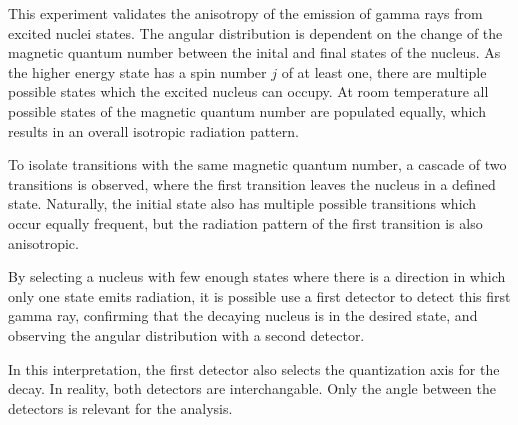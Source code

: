 
This experiment validates  the anisotropy of the emission of gamma rays from excited nuclei states.
The angular distribution is dependent on the change of the magnetic quantum number between the inital and final states of the nucleus.
As the higher energy state has a spin number $j$ of at least one, there are multiple possible states which the excited nucleus can occupy.
At room temperature all possible states of the magnetic quantum number are populated equally, which results in an overall isotropic radiation pattern.

To isolate transitions with the same magnetic quantum number, a cascade of two transitions is observed, where the first transition leaves the nucleus in a defined state.
Naturally, the initial state also has multiple possible transitions which occur equally frequent, but the radiation pattern of the first transition is also anisotropic.

By selecting a nucleus with few enough states where there is a direction in which only one state emits radiation, it is possible use a first detector to detect this first gamma ray, confirming that the decaying nucleus is in the desired state, and observing the angular distribution with a second detector.

In this interpretation, the first detector also selects the quantization axis for the decay.
In reality, both detectors are interchangable.
Only the angle between the detectors is relevant for the analysis.
